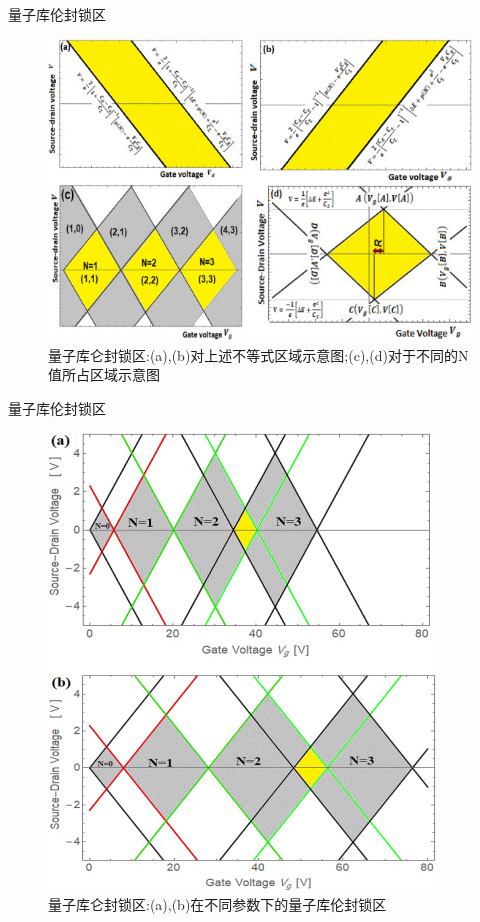 \documentclass{beamer}[fontset=windows]
\begin{document}
    \begin{frame}
    \begin{block}{量子库伦封锁区}
    \begin{figure}[H]
    \centering
    \hspace{2em}\includegraphics[width=.7\linewidth]{pic/3.jpg}
    \caption{量子库仑封锁区:(a),(b)对上述不等式区域示意图;(c),(d)对于不同的N值所占区域示意图\cite{MOULHIM2020114078}}
    \end{figure}
    \end{block}
    \end{frame}
    \begin{frame}
    \begin{block}{量子库伦封锁区}
    \begin{figure}[H]
    \centering
    \hspace{2em}\includegraphics[width=.45\linewidth]{pic/4.jpg}
    \caption{量子库仑封锁区:(a),(b)在不同参数下的量子库伦封锁区\cite{MOULHIM2020114078}}
    \end{figure}
    \end{block}
    \end{frame}
\end{document}
